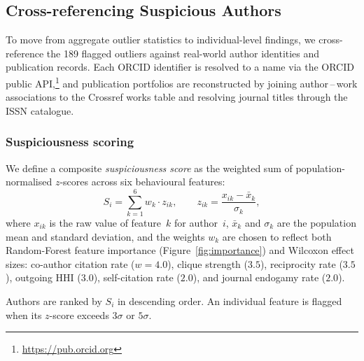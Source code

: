 
\subsection{Cross-referencing Suspicious Authors}\label{sec:suspicious-authors}

To move from aggregate outlier statistics to individual-level findings,
we cross-reference the 189 flagged outliers against real-world author
identities and publication records.
Each ORCID identifier is resolved to a name via the ORCID public
API,\footnote{\url{https://pub.orcid.org}} and publication portfolios
are reconstructed by joining author\,--\,work associations to the
Crossref works table and resolving journal titles through the ISSN
catalogue.

\subsubsection*{Suspiciousness scoring}

We define a composite \emph{suspiciousness score} as the weighted sum
of population-normalised $z$-scores across six behavioural features:
%
\begin{equation}\label{eq:susp}
  S_i = \sum_{k=1}^{6} w_k \cdot z_{ik},
  \qquad
  z_{ik} = \frac{x_{ik} - \bar{x}_k}{\sigma_k},
\end{equation}
%
where $x_{ik}$ is the raw value of feature~$k$ for author~$i$,
$\bar{x}_k$ and $\sigma_k$ are the population mean and standard
deviation, and the weights $w_k$ are chosen to reflect both
Random-Forest feature importance (Figure~\ref{fig:importance}) and
Wilcoxon effect sizes:
co-author citation rate ($w=4.0$),
clique strength ($3.5$),
reciprocity rate ($3.5$),
outgoing HHI ($3.0$),
self-citation rate ($2.0$),
and journal endogamy rate ($2.0$).

Authors are ranked by $S_i$ in descending order.
An individual feature is flagged when its $z$-score exceeds $3\sigma$
or $5\sigma$.

